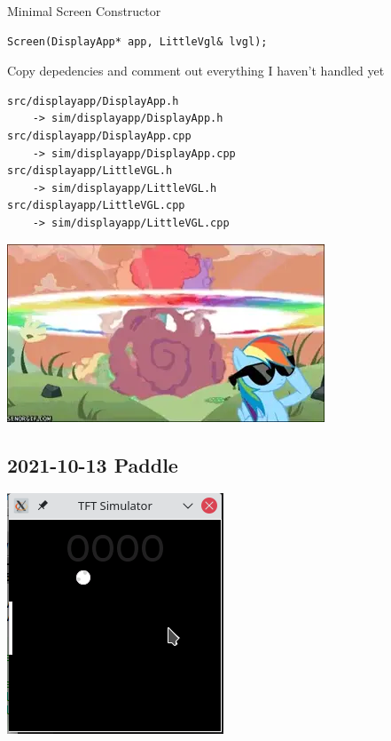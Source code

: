 \documentclass{beamer}
\begin{document}
\begin{frame}[fragile]{}

  Minimal Screen Constructor
  \begin{verbatim}
Screen(DisplayApp* app, LittleVgl& lvgl);
  \end{verbatim}

  Copy depedencies and comment out everything I haven't handled yet

  \begin{verbatim}
src/displayapp/DisplayApp.h
    -> sim/displayapp/DisplayApp.h
src/displayapp/DisplayApp.cpp
    -> sim/displayapp/DisplayApp.cpp
src/displayapp/LittleVGL.h
    -> sim/displayapp/LittleVGL.h
src/displayapp/LittleVGL.cpp
    -> sim/displayapp/LittleVGL.cpp
  \end{verbatim}
\end{frame}

\begin{frame}{}
  \includegraphics[width=\textwidth]{../rainboom-0}
\end{frame}

\subsection{2021-10-13 Paddle}
\begin{frame}{}
  \centering\includegraphics[height=0.8\paperheight]{../2021-10-13_Paddle.png}
\end{frame}
\end{document}
